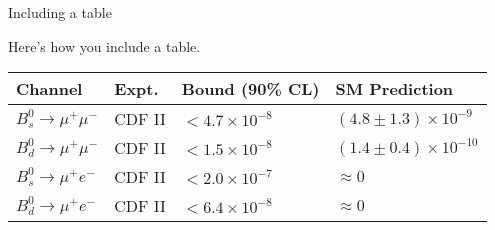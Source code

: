 \begin{frame}[c]{Including a table}

	Here's how you include a table.
	\vspace{1em}

	\footnotesize
		\begin{tabular}{llll}\hline
		\textbf{Channel} & \textbf{Expt.} & \textbf{Bound (90\% CL)} & \textbf{SM Prediction} \\ \hline
		\textcolor{FlipGreen}{$B^0_s \to \mu^+ \mu^-$} & \textcolor{FlipGreen}{CDF II}
		                  & \textcolor{FlipGreen}{$<4.7\times 10^{-8}$}
		                  & \textcolor{FlipGreen}{$(4.8\pm 1.3) \times 10^{-9}$} \\
		$B^0_d \to \mu^+ \mu^-$ & CDF II
		                  & $<1.5\times 10^{-8}$
		                  & $(1.4\pm 0.4) \times 10^{-10}$  \\
		\hline
		$B^0_s \to \mu^+ e^-$ & CDF II
		                  & $<2.0\times 10^{-7}$
		                  & $\approx 0$ \\
		$B^0_d \to \mu^+ e^-$ & CDF II
		                  & $<6.4 \times 10^{-8}$
		                  & $\approx 0$ \\
		\hline
		\end{tabular}
		\vspace{1em}

		\normalsize
\end{frame}


